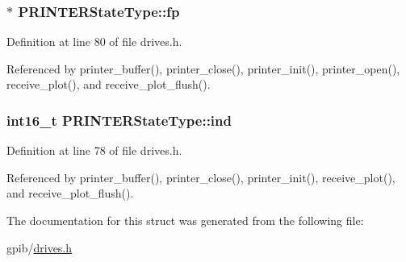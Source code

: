 \subsubsection[{\texorpdfstring{fp}{fp}}]{$\ast$ P\+R\+I\+N\+T\+E\+R\+State\+Type\+::fp}\hypertarget{structPRINTERStateType_a791c78d68d169f9d2e60d34b890e520a}{}\label{structPRINTERStateType_a791c78d68d169f9d2e60d34b890e520a}


Definition at line 80 of file drives.\+h.



Referenced by printer\+\_\+buffer(), printer\+\_\+close(), printer\+\_\+init(), printer\+\_\+open(), receive\+\_\+plot(), and receive\+\_\+plot\+\_\+flush().

\subsubsection[{\texorpdfstring{ind}{ind}}]{\setlength{\rightskip}{0pt plus 5cm}int16\+\_\+t P\+R\+I\+N\+T\+E\+R\+State\+Type\+::ind}\hypertarget{structPRINTERStateType_a7d8873d0011f31d7dd00c2b7e0d362bd}{}\label{structPRINTERStateType_a7d8873d0011f31d7dd00c2b7e0d362bd}


Definition at line 78 of file drives.\+h.



Referenced by printer\+\_\+buffer(), printer\+\_\+close(), printer\+\_\+init(), receive\+\_\+plot(), and receive\+\_\+plot\+\_\+flush().



The documentation for this struct was generated from the following file\+:\begin{DoxyCompactItemize}
\item 
gpib/\hyperlink{drives_8h}{drives.\+h}\end{DoxyCompactItemize}
